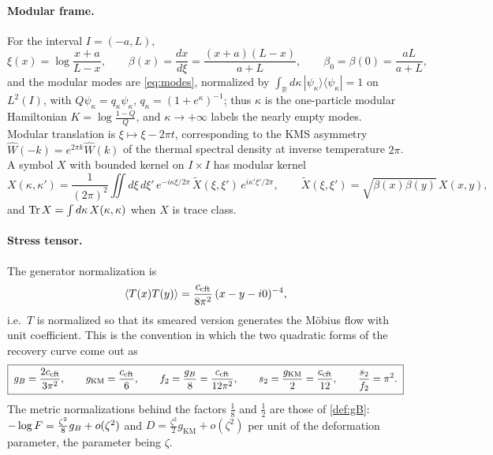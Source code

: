 \paragraph{Modular frame.}
For the interval $I=(-a,L)$,
\begin{equation}\label{eq:modframe}
 \xi(x)=\log\frac{x+a}{L-x},
 \qquad
 \beta(x)=\frac{dx}{d\xi}=\frac{(x+a)(L-x)}{a+L},
 \qquad
 \beta_0=\beta(0)=\frac{aL}{a+L},
\end{equation}
and the modular modes are \eqref{eq:modes}, normalized by
$\int_{\mathbb R}d\kappa\,|\psi_\kappa\rangle\langle\psi_\kappa|=1$ on $L^2(I)$,
with $Q\psi_\kappa=q_\kappa\psi_\kappa$, $q_\kappa=(1+e^\kappa)^{-1}$; thus
$\kappa$ is the one-particle modular Hamiltonian $K=\log\frac{1-Q}Q$, and
$\kappa\to+\infty$ labels the nearly empty modes.  Modular translation is
$\xi\mapsto\xi-2\pi t$, corresponding to the KMS asymmetry
$\widehat W(-k)=e^{2\pi k}\widehat W(k)$ of the thermal spectral density at
inverse temperature $2\pi$.  A symbol $X$ with bounded kernel on $I\times I$ has
modular kernel
\begin{equation}\label{eq:modkernel}
 X(\kappa,\kappa')
 =\frac1{(2\pi)^2}\iint d\xi\,d\xi'\,
 e^{-i\kappa\xi/2\pi}\,\widetilde X(\xi,\xi')\,e^{i\kappa'\xi'/2\pi},
 \qquad
 \widetilde X(\xi,\xi')=\sqrt{\beta(x)\beta(y)}\,X(x,y),
\end{equation}
and $\operatorname{Tr} X=\int d\kappa\,X(\kappa,\kappa)$ when $X$ is trace class.

\paragraph{Stress tensor.}
The generator normalization is
\begin{equation}\label{eq:TT}
 \langle T(x)T(y)\rangle=\frac{c_{\rm cft}}{8\pi^2}\,(x-y-i0)^{-4},
\end{equation}
i.e.\ $T$ is normalized so that its smeared version generates the M\"obius flow
with unit coefficient.  This is the convention in which the two quadratic forms of
the recovery curve come out as
\begin{equation}\label{eq:constants}
 \boxed{\;
 g_B=\frac{2c_{\rm cft}}{3\pi^2},\qquad
 g_{\mathrm{KM}}=\frac{c_{\rm cft}}6,\qquad
 f_2=\frac{g_B}8=\frac{c_{\rm cft}}{12\pi^2},\qquad
 s_2=\frac{g_{\mathrm{KM}}}2=\frac{c_{\rm cft}}{12},\qquad
 \frac{s_2}{f_2}=\pi^2 .\;}
\end{equation}
The metric normalizations behind the factors $\frac18$ and $\frac12$ are those of
\cref{def:gB}:
$-\log F=\frac{\zeta^2}8g_B+o(\zeta^2)$ and $D=\frac{\zeta^2}2g_{\mathrm{KM}}+o(\zeta^2)$ per
unit of the deformation parameter, the parameter being $\zeta$.

